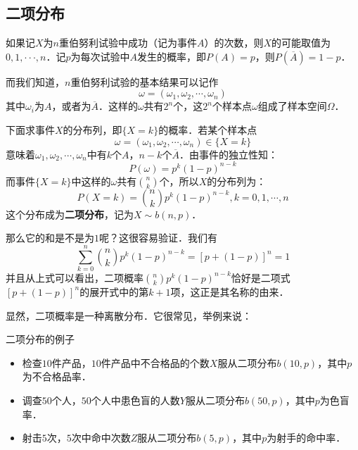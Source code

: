 
\subsection{二项分布}
如果记$X $为$n $重伯努利试验中成功（记为事件$A$）的次数，则$X $的可能取值为$0,1,···,n$．记$p $为每次试验中$A $发生的概率，即$P(A)=p$，则$P(\overline{A})=1-p$．

而我们知道，$n$重伯努利试验的基本结果可以记作
\begin{equation}
\omega=\left(\omega_{1}, \omega_{2}, \cdots, \omega_{n}\right)
\end{equation}
其中$\omega_i$为$A$，或者为$\overline{A}$．这样的$\omega$共有$2^n$个，这$2^n$个样本点$\omega$组成了样本空间$\Omega$．

下面求事件$X$的分布列，即$\{X=k\}$的概率．若某个样本点
\begin{equation}
\omega=\left(\omega_{1}, \omega_{2}, \cdots, \omega_{n}\right) \in\{X=k\}
\end{equation}
意味着$\omega_1,\omega_2,\cdots,\omega_n$中有$k$个$A$，$n-k$个$\overline A$．由事件的独立性知：
\begin{equation}
P(\omega)=p^{k}(1-p)^{n-k}
\end{equation}
而事件$\{X=k\}$中这样的$\omega$共有$\binom nk$个，所以$X$的分布列为：
\begin{equation}
P(X=k)=\binom nk p^{k}(1-p)^{n-k}, k=0,1, \cdots, n
\end{equation}
这个分布成为\textbf{二项分布}，记为$X\sim b(n, p)$．

那么它的和是不是为$1$呢？这很容易验证．我们有
\begin{equation}
\sum_{k=0}^{n}\binom nk p^{k}(1-p)^{n-k}=[p+(1-p)]^{n}=1
\end{equation}
并且从上式可以看出，二项概率$\binom nk p^{k}(1-p)^{n-k}$恰好是二项式$[p+(1-p)]^{n}$的展开式中的第$k+1$项，这正是其名称的由来．

显然，二项概率是一种离散分布．它很常见，举例来说：
\begin{example}{二项分布的例子}
\begin{itemize}
\item 检查$10$件产品，$ 10 $件产品中不合格品的个数$X $服从二项分布$b(10,p)$，其中$p$为不合格品率．
\item 调查$50 $个人，$ 50 $个人中患色盲的人数$Y $服从二项分布$b(50,p)$，其中$p$为色盲率．
\item 射击$5 $次，$ 5 $次中命中次数$Z $服从二项分布$b(5,p)$，其中$p $为射手的命中率．
\end{itemize}
\end{example}

